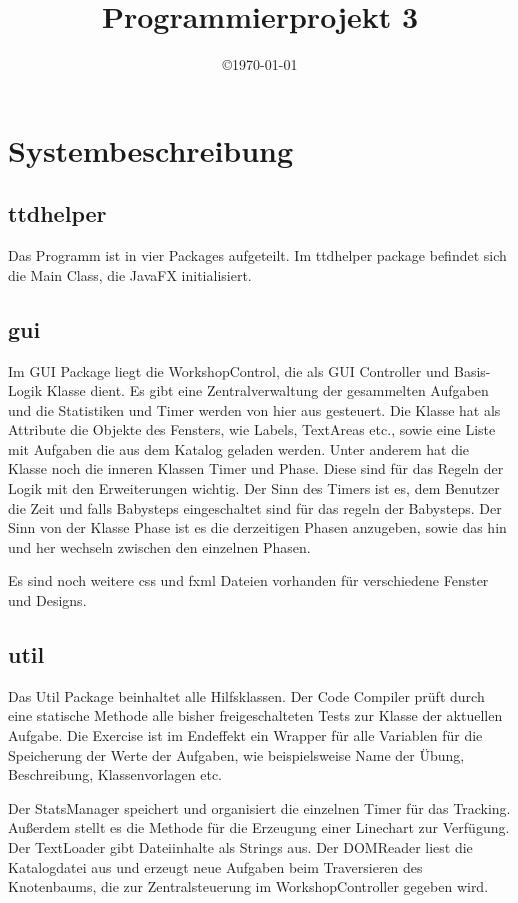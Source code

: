 \documentclass[12pt]{article}
\title{Programmierprojekt 3}
\date{\copyright\today}
\begin{document}
	
	\newpage
	
	\section{Systembeschreibung}
	\subsection{ttdhelper}
	Das Programm ist in vier Packages aufgeteilt.
	Im ttdhelper package befindet sich die Main Class, die JavaFX initialisiert.
	\subsection{gui}
	Im GUI Package liegt die WorkshopControl, die als GUI Controller und Basis-Logik Klasse dient. Es gibt eine Zentralverwaltung der gesammelten Aufgaben und die Statistiken und Timer werden von hier aus gesteuert.
	Die Klasse hat als Attribute die Objekte des Fensters, wie Labels, TextAreas etc., sowie eine Liste mit Aufgaben die aus dem Katalog geladen werden. Unter anderem hat die Klasse noch die inneren Klassen Timer und Phase. Diese sind für das Regeln der Logik mit den Erweiterungen wichtig. Der Sinn des Timers ist es, dem Benutzer die Zeit und falls Babysteps eingeschaltet sind für das regeln der Babysteps. Der Sinn von der Klasse Phase ist es die derzeitigen Phasen anzugeben, sowie das hin und her wechseln zwischen den einzelnen Phasen.
	 
	Es sind noch weitere css und fxml Dateien vorhanden für verschiedene Fenster und Designs.
	\subsection{util}
	Das Util Package beinhaltet alle Hilfsklassen. 
	Der Code Compiler prüft durch eine statische Methode alle bisher freigeschalteten Tests zur Klasse der aktuellen Aufgabe.
	Die Exercise ist im Endeffekt ein Wrapper für alle Variablen für die Speicherung der Werte der Aufgaben, wie beispielsweise Name der Übung, Beschreibung, Klassenvorlagen etc.
	
	Der StatsManager speichert und organisiert die einzelnen Timer für das Tracking. Außerdem stellt es die Methode für die Erzeugung einer Linechart zur Verfügung.
	Der TextLoader gibt Dateiinhalte als Strings aus.
	Der DOMReader liest die Katalogdatei aus und erzeugt neue Aufgaben beim Traversieren des Knotenbaums, die zur Zentralsteuerung im WorkshopController gegeben wird.
\end{document}
